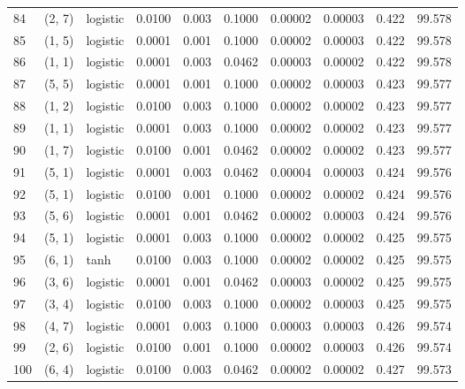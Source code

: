 \begin{tabular}{lllrrrrrrr}
84  &      (2, 7) &  logistic &  0.0100 &  0.003 &  0.1000 &          0.00002 &    0.00003 &       0.422 &    99.578 \\
85  &      (1, 5) &  logistic &  0.0001 &  0.001 &  0.1000 &          0.00002 &    0.00003 &       0.422 &    99.578 \\
86  &      (1, 1) &  logistic &  0.0001 &  0.003 &  0.0462 &          0.00003 &    0.00002 &       0.422 &    99.578 \\
87  &      (5, 5) &  logistic &  0.0001 &  0.001 &  0.1000 &          0.00002 &    0.00003 &       0.423 &    99.577 \\
88  &      (1, 2) &  logistic &  0.0100 &  0.003 &  0.1000 &          0.00002 &    0.00002 &       0.423 &    99.577 \\
89  &      (1, 1) &  logistic &  0.0001 &  0.003 &  0.1000 &          0.00002 &    0.00002 &       0.423 &    99.577 \\
90  &      (1, 7) &  logistic &  0.0100 &  0.001 &  0.0462 &          0.00002 &    0.00002 &       0.423 &    99.577 \\
91  &      (5, 1) &  logistic &  0.0001 &  0.003 &  0.0462 &          0.00004 &    0.00003 &       0.424 &    99.576 \\
92  &      (5, 1) &  logistic &  0.0100 &  0.001 &  0.1000 &          0.00002 &    0.00002 &       0.424 &    99.576 \\
93  &      (5, 6) &  logistic &  0.0001 &  0.001 &  0.0462 &          0.00002 &    0.00003 &       0.424 &    99.576 \\
94  &      (5, 1) &  logistic &  0.0001 &  0.003 &  0.1000 &          0.00002 &    0.00002 &       0.425 &    99.575 \\
95  &      (6, 1) &      tanh &  0.0100 &  0.003 &  0.1000 &          0.00002 &    0.00002 &       0.425 &    99.575 \\
96  &      (3, 6) &  logistic &  0.0001 &  0.001 &  0.0462 &          0.00003 &    0.00002 &       0.425 &    99.575 \\
97  &      (3, 4) &  logistic &  0.0100 &  0.003 &  0.1000 &          0.00002 &    0.00003 &       0.425 &    99.575 \\
98  &      (4, 7) &  logistic &  0.0001 &  0.003 &  0.1000 &          0.00003 &    0.00003 &       0.426 &    99.574 \\
99  &      (2, 6) &  logistic &  0.0100 &  0.001 &  0.1000 &          0.00002 &    0.00003 &       0.426 &    99.574 \\
100 &      (6, 4) &  logistic &  0.0100 &  0.003 &  0.0462 &          0.00002 &    0.00002 &       0.427 &    99.573 \\

\end{tabular}
